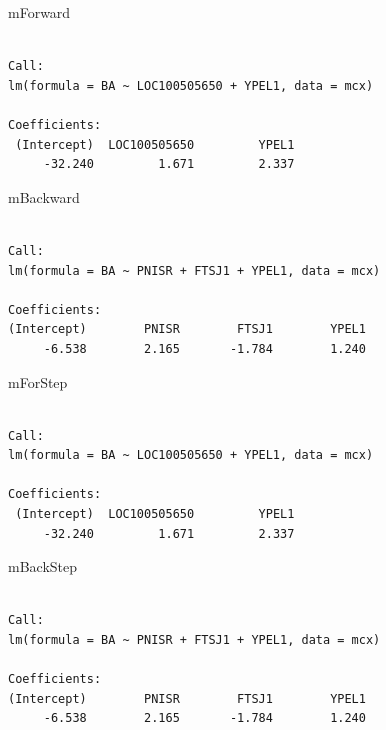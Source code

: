 \documentclass[
  dutch,
  letterpaper,
  12pt]{book}
\newenvironment{Shaded}{\begin{snugshade}}{\end{snugshade}}
\newcommand{\NormalTok}[1]{\textcolor[rgb]{0.00,0.23,0.31}{#1}}
\theoremstyle{definition}
\theoremstyle{definition}
\theoremstyle{definition}
\theoremstyle{remark}
\begin{document}
\begin{Shaded}
\begin{Highlighting}[]
\NormalTok{mForward }
\end{Highlighting}
\end{Shaded}

\begin{verbatim}

Call:
lm(formula = BA ~ LOC100505650 + YPEL1, data = mcx)

Coefficients:
 (Intercept)  LOC100505650         YPEL1  
     -32.240         1.671         2.337  
\end{verbatim}

\begin{Shaded}
\begin{Highlighting}[]
\NormalTok{mBackward}
\end{Highlighting}
\end{Shaded}

\begin{verbatim}

Call:
lm(formula = BA ~ PNISR + FTSJ1 + YPEL1, data = mcx)

Coefficients:
(Intercept)        PNISR        FTSJ1        YPEL1  
     -6.538        2.165       -1.784        1.240  
\end{verbatim}

\begin{Shaded}
\begin{Highlighting}[]
\NormalTok{mForStep}
\end{Highlighting}
\end{Shaded}

\begin{verbatim}

Call:
lm(formula = BA ~ LOC100505650 + YPEL1, data = mcx)

Coefficients:
 (Intercept)  LOC100505650         YPEL1  
     -32.240         1.671         2.337  
\end{verbatim}

\begin{Shaded}
\begin{Highlighting}[]
\NormalTok{mBackStep}
\end{Highlighting}
\end{Shaded}

\begin{verbatim}

Call:
lm(formula = BA ~ PNISR + FTSJ1 + YPEL1, data = mcx)

Coefficients:
(Intercept)        PNISR        FTSJ1        YPEL1  
     -6.538        2.165       -1.784        1.240  
\end{verbatim}
\end{document}
